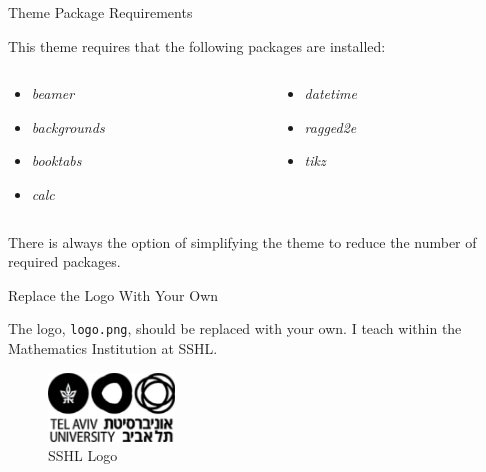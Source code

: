 \documentclass[newPxFont,numfooter,sectionpages]{beamer}
\begin{document}

\begin{frame}{Theme Package Requirements}

This theme requires that the following packages are installed:

\begin{columns}[t]
\begin{column}{0.5\textwidth}
\begin{itemize}
\item \emph{beamer}
\item \emph{backgrounds}
\item \emph{booktabs}
\item \emph{calc}
\end{itemize}
\end{column}

\begin{column}{0.5\textwidth}
\begin{itemize}
\item \emph{datetime}
\item \emph{ragged2e}
\item \emph{tikz}
\end{itemize}
\end{column}
\end{columns}
\vspace{1cm}
There is always the option of simplifying the theme to reduce the number of required packages. 

\end{frame}


\begin{frame}{Replace the Logo With Your Own}

The  logo, \texttt{logo.png}, should be replaced with your own.  I teach within the Mathematics Institution at SSHL.
\vspace{1cm}
\begin{figure}
	\centerline{\includegraphics[width=0.3\textwidth]{logo.png}}
\caption{SSHL Logo}
\end{figure}

\end{frame}
\end{document}
